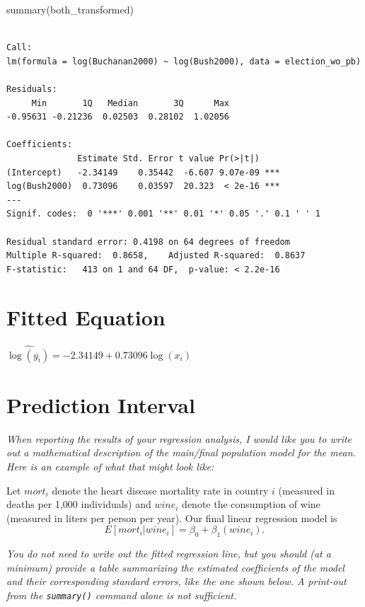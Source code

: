 \documentclass[
  letterpaper,
  DIV=11,
  numbers=noendperiod]{scrartcl}
\newenvironment{Shaded}{\begin{snugshade}}{\end{snugshade}}
\newcommand{\FunctionTok}[1]{\textcolor[rgb]{0.28,0.35,0.67}{#1}}
\newcommand{\NormalTok}[1]{\textcolor[rgb]{0.00,0.23,0.31}{#1}}
\begin{document}
\begin{Shaded}
\begin{Highlighting}[]
\FunctionTok{summary}\NormalTok{(both\_transformed)}
\end{Highlighting}
\end{Shaded}

\begin{verbatim}

Call:
lm(formula = log(Buchanan2000) ~ log(Bush2000), data = election_wo_pb)

Residuals:
     Min       1Q   Median       3Q      Max 
-0.95631 -0.21236  0.02503  0.28102  1.02056 

Coefficients:
              Estimate Std. Error t value Pr(>|t|)    
(Intercept)   -2.34149    0.35442  -6.607 9.07e-09 ***
log(Bush2000)  0.73096    0.03597  20.323  < 2e-16 ***
---
Signif. codes:  0 '***' 0.001 '**' 0.01 '*' 0.05 '.' 0.1 ' ' 1

Residual standard error: 0.4198 on 64 degrees of freedom
Multiple R-squared:  0.8658,    Adjusted R-squared:  0.8637 
F-statistic:   413 on 1 and 64 DF,  p-value: < 2.2e-16
\end{verbatim}

\hypertarget{fitted-equation}{%
\section{Fitted Equation}\label{fitted-equation}}

\(\widehat{\log(y_i)} = -2.34149 + 0.73096\log(x_i)\)

\hypertarget{prediction-interval}{%
\section{Prediction Interval}\label{prediction-interval}}

\emph{When reporting the results of your regression analysis, I would
like you to write out a mathematical description of the main/final
population model for the mean. Here is an example of what that might
look like:}

Let \(mort_i\) denote the heart disease mortality rate in country \(i\)
(measured in deaths per 1,000 individuals) and \(wine_i\) denote the
consumption of wine (measured in liters per person per year). Our final
linear regression model is
\[E[mort_i | wine_i] = \beta_0 + \beta_1\left(wine_i\right).\]

\emph{You do not need to write out the fitted regression line, but you
should (at a minimum) provide a table summarizing the estimated
coefficients of the model and their corresponding standard errors, like
the one shown below. A print-out from the \texttt{summary()} command
alone is not sufficient.}
\end{document}
